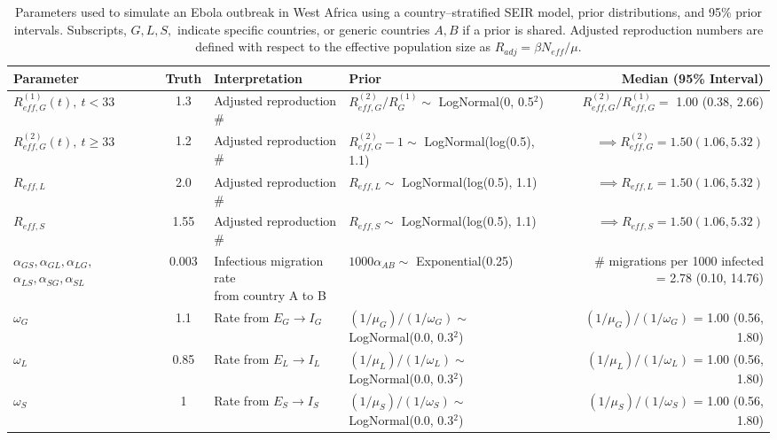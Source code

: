 \begin{table}
	\begin{fullpage}
		\caption[Parameters and priors for a simulated Ebola outbreak in West Africa.]{Parameters used to simulate an Ebola outbreak in West Africa using a country--stratified SEIR model, prior distributions, and 95\% prior intervals. Subscripts, $ G,L,S, $ indicate specific countries, or generic countries $ A,B $ if a prior is shared. Adjusted reproduction numbers are defined with respect to the effective population size as $ R_{adj} = \beta N_{eff} /\mu $.}
		\label{tab:ebola_synth_pars}
		\scriptsize
	\centering
	\begin{tabular}{lcllr}
		\hline
		\textbf{Parameter} & \textbf{Truth} & \textbf{Interpretation} & \textbf{Prior} & \textbf{Median (95\% Interval)} \\ \hline
		$ R_{eff,G}^{(1)}(t),\ t<33 $ & 1.3 & Adjusted reproduction \#  & $ R_{eff,G}^{(2)} / R_G^{(1)}\sim $ LogNormal(0, 0.5$ ^2 $) & $ R_{eff,G}^{(2)} / R_{eff,G}^{(1)} = $ 1.00 (0.38, 2.66) \\
		$ R_{eff,G}^{(2)}(t),\ t\geq33 $ & 1.2 & Adjusted reproduction \# & $ R_{eff,G}^{(2)}-1\sim $ LogNormal(log(0.5), 1.1) & $ \implies R_{eff,G}^{(2)} = 1.50 (1.06, 5.32)$ \\
		$ R_{eff,L} $ & 2.0 & Adjusted reproduction \# & $ R_{eff,L}\sim $ LogNormal(log(0.5), 1.1) & $ \implies R_{eff,L} = 1.50 (1.06, 5.32)$ \\
		$ R_{eff,S} $ & 1.55 & Adjusted reproduction \# & $ R_{eff,S}\sim $ LogNormal(log(0.5), 1.1) & $ \implies R_{eff,S} = 1.50 (1.06, 5.32)$ \\
		\makecell[l]{$ \alpha_{GS},\alpha_{GL}, \alpha_{LG},$\\
		$ \alpha_{LS},\alpha_{SG}, \alpha_{SL} $} & 0.003 & \makecell[l]{Infectious migration rate \\ from country A to B} & $ 1000\alpha_{AB} \sim$ Exponential(0.25) & \makecell[r]{\# migrations per 1000 infected \\ = 2.78 (0.10, 14.76)}\\ 
		$ \omega_G $ & 1.1 & Rate from $ E_G\rightarrow I_G $ & $ (1/\mu_G)\big/(1/\omega_G) \sim $ LogNormal(0.0, 0.3$ ^2 $) & $ (1/\mu_G)\big/(1/\omega_G) $ = 1.00 (0.56, 1.80) \\
		$ \omega_L $ & 0.85 & Rate from $ E_L\rightarrow I_L $ & $ (1/\mu_L)\big/(1/\omega_L) \sim $ LogNormal(0.0, 0.3$ ^2 $) & $ (1/\mu_L)\big/(1/\omega_L) $ = 1.00 (0.56, 1.80) \\
		$ \omega_S $ & 1 & Rate from $ E_S\rightarrow I_S $ & $ (1/\mu_S)\big/(1/\omega_S) \sim $ LogNormal(0.0, 0.3$ ^2 $) & $ (1/\mu_S)\big/(1/\omega_S) $ = 1.00 (0.56, 1.80) \\

\end{tabular}
\end{fullpage}
\end{table}

